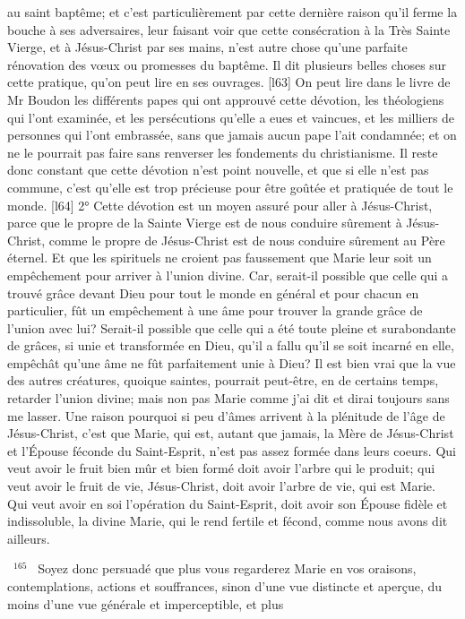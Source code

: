 \documentclass[paper=a5,pagesize=pdftex,fontsize=15pt,headinclude=on,twoside=off]{scrbook}
\newcommand{\negphantom}[1]{\settowidth{\dimen0}{#1}\hspace*{-\dimen0}}
\newcommand{\versenb}[1]{\par \vspace{10pt}~\negphantom{~${}^{#1}$~}${}^{#1}$~}
\begin{document}
au saint baptême; et c'est particulièrement par cette dernière raison qu'il ferme la bouche à ses adversaires, leur
faisant voir que cette consécration à la Très Sainte Vierge, et à Jésus-Christ par ses mains, n'est autre chose
qu'une parfaite rénovation des vœux ou promesses du baptême. Il dit plusieurs belles choses sur cette pratique,
qu'on peut lire en ses ouvrages.
[l63] On peut lire dans le livre de Mr Boudon les différents papes qui ont approuvé cette dévotion, les théologiens
qui l'ont examinée, et les persécutions qu'elle a eues et vaincues, et les milliers de personnes qui l'ont embrassée,
sans que jamais aucun pape l'ait condamnée; et on ne le pourrait pas faire sans renverser les fondements du
christianisme. Il reste donc constant que cette dévotion n'est point nouvelle, et que si elle n'est pas commune, c'est
qu'elle est trop précieuse pour être goûtée et pratiquée de tout le monde.
[l64] 2° Cette dévotion est un moyen assuré pour aller à Jésus-Christ, parce que le propre de la Sainte Vierge est
de nous conduire sûrement à Jésus-Christ, comme le propre de Jésus-Christ est de nous conduire sûrement au
Père éternel. Et que les spirituels ne croient pas faussement que Marie leur soit un empêchement pour arriver à
l'union divine. Car, serait-il possible que celle qui a trouvé grâce devant Dieu pour tout le monde en général et pour
chacun en particulier, fût un empêchement à une âme pour trouver la grande grâce de l'union avec lui? Serait-il
possible que celle qui a été toute pleine et surabondante de grâces, si unie et transformée en Dieu, qu'il a fallu qu'il
se soit incarné en elle, empêchât qu'une âme ne fût parfaitement unie à Dieu?
Il est bien vrai que la vue des autres créatures, quoique saintes, pourrait peut-être, en de certains temps, retarder
l'union divine; mais non pas Marie comme j'ai dit et dirai toujours sans me lasser. Une raison pourquoi si peu
d'âmes arrivent à la plénitude de l'âge de Jésus-Christ, c'est que Marie, qui est, autant que jamais, la Mère de
Jésus-Christ et l'Épouse féconde du Saint-Esprit, n'est pas assez formée dans leurs coeurs. Qui veut avoir le fruit
bien mûr et bien formé doit avoir l'arbre qui le produit; qui veut avoir le fruit de vie, Jésus-Christ, doit avoir l'arbre
de vie, qui est Marie. Qui veut avoir en soi l'opération du Saint-Esprit, doit avoir son Épouse fidèle et indissoluble,
la divine Marie, qui le rend fertile et fécond, comme nous avons dit ailleurs.
\versenb{165} Soyez donc persuadé que plus vous regarderez Marie en vos oraisons, contemplations, actions et
souffrances, sinon d'une vue distincte et aperçue, du moins d'une vue générale et imperceptible, et plus
\end{document}
